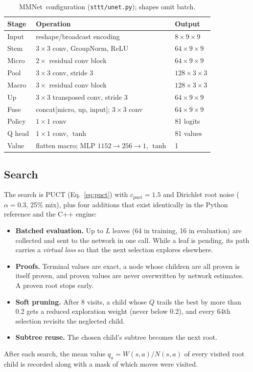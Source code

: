 \documentclass[conference]{IEEEtran}
\newcommand{\code}[1]{\texttt{#1}}
\newcommand{\net}{MMNet}       %
\begin{document}
\begin{table}[t]
  \centering\footnotesize
  \caption{\net\ configuration (\code{sttt/unet.py}); shapes omit batch.}
  \label{tab:unet}
  \begin{tabular}{@{}lll@{}}
    \toprule
    Stage & Operation & Output \\
    \midrule
    Input & reshape/broadcast encoding & $8\times9\times9$ \\
    Stem & $3\times3$ conv, GroupNorm, ReLU & $64\times9\times9$ \\
    Micro & $2\times$ residual conv block & $64\times9\times9$ \\
    Pool & $3\times3$ conv, stride 3 & $128\times3\times3$ \\
    Macro & $3\times$ residual conv block & $128\times3\times3$ \\
    Up & $3\times3$ transposed conv, stride 3 & $64\times9\times9$ \\
    Fuse & concat[micro, up, input]; $3\times3$ conv & $64\times9\times9$ \\
    Policy & $1\times1$ conv & 81 logits \\
    Q head & $1\times1$ conv, $\tanh$ & 81 values \\
    Value & flatten macro; MLP $1152{\to}256{\to}1$, $\tanh$ & 1 \\
    \bottomrule
  \end{tabular}
\end{table}

\subsection{Search}

The search is PUCT (Eq.~\ref{eq:puct}) with $c_{\mathrm{puct}}=1.5$ and
Dirichlet root noise ($\alpha=0.3$, 25\% mix), plus four additions that
exist identically in the Python reference and the C++ engine:
\begin{itemize}\setlength{\itemsep}{0pt}
  \item \textbf{Batched evaluation.} Up to $L$ leaves (64 in training, 16
        in evaluation) are collected and sent to the network in one call.
        While a leaf is pending, its path carries a \emph{virtual loss} so
        that the next selection explores elsewhere.
  \item \textbf{Proofs.} Terminal values are exact, a node whose children
        are all proven is itself proven, and proven values are never
        overwritten by network estimates. A proven root stops early.
  \item \textbf{Soft pruning.} After 8 visits, a child whose $Q$ trails
        the best by more than 0.2 gets a reduced exploration weight (never
        below 0.2), and every 64th selection revisits the neglected child.
  \item \textbf{Subtree reuse.} The chosen child's subtree becomes the
        next root.
\end{itemize}
After each search, the mean value $q_a=W(s,a)/N(s,a)$ of every visited
root child is recorded along with a mask of which moves were visited.
\end{document}
